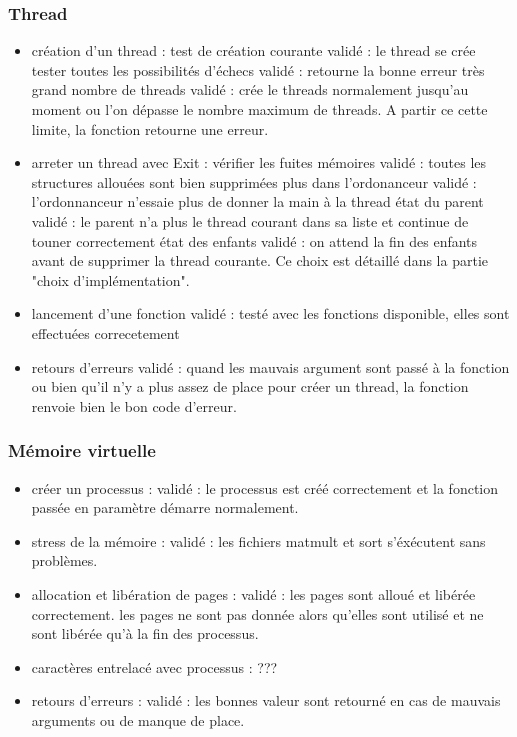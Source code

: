\documentclass{article}
\begin{document}
		\subsubsection{Thread}
			\begin{itemize}
				\item création d'un thread :
					\subitem test de création courante 				validé : le thread se crée
					\subitem tester toutes les possibilités d'échecs	validé : retourne la bonne erreur
					\subitem très grand nombre de threads 				validé : crée le threads normalement jusqu'au moment ou l'on dépasse le nombre maximum de threads. A partir ce cette limite, la fonction retourne une erreur.
				\item arreter un thread avec Exit :
					\subitem vérifier les fuites mémoires		validé : toutes les structures allouées sont bien supprimées
					\subitem plus dans l'ordonanceur			validé : l'ordonnanceur n'essaie plus de donner la main à la thread
					\subitem état du parent					validé : le parent n'a plus le thread courant dans sa liste et continue de touner correctement
					\subitem état des enfants					validé : on attend la fin des enfants avant de supprimer la thread courante. Ce choix est détaillé dans la partie "choix d'implémentation".
				\item lancement d'une fonction		validé : testé avec les fonctions disponible, elles sont effectuées correcetement
				\item retours d'erreurs				validé : quand les mauvais argument sont passé à la fonction ou bien qu'il n'y a plus assez de place pour créer un thread, la fonction renvoie bien le bon code d'erreur.
			\end{itemize}

		\subsubsection{Mémoire virtuelle}
			\begin{itemize}
				\item créer un processus :					validé : le processus est créé correctement et la fonction passée en paramètre démarre normalement.
				\item stress de la mémoire :				validé : les fichiers matmult et sort s'éxécutent sans problèmes.
				\item allocation et libération de pages : 	validé : les pages sont alloué et libérée correctement. les pages ne sont pas donnée alors qu'elles sont utilisé et ne sont libérée qu'à la fin des processus.
				\item caractères entrelacé avec processus : ???
				\item retours d'erreurs : 					validé : les bonnes valeur sont retourné en cas de mauvais arguments ou de manque de place.
			\end{itemize}
\end{document}
